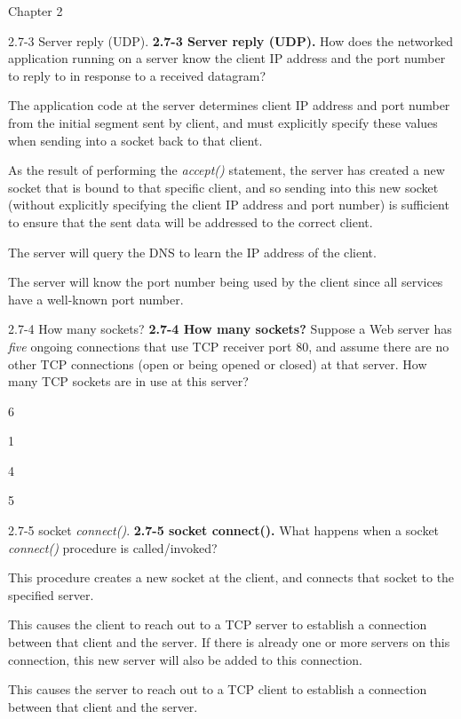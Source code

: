\documentclass[a4paper]{article}
\begin{document}
\begin{quiz}{Chapter 2}
\begin{multi}[points=1,shuffle]{2.7-3 Server reply (UDP).}
\textbf{2.7-3 Server reply (UDP).} 
How does the networked application running on a server know the client IP address and the port number to reply to in response to a received datagram?
\item* The  application code at the server determines client IP address and port number from the initial segment sent by client, and must explicitly specify these values when sending into a socket back to that client.
\item As the result of performing the \emph{accept()} statement, the server has created a new socket that is bound to that specific client, and so sending into this new socket (without explicitly specifying the client IP address and port number) is sufficient to ensure that the sent data will be addressed to the correct client.
\item The server will query the DNS to learn the IP address of the client.
\item The server will know the port number being used by the client since all services have a well-known port number.
\end{multi}

\begin{multi}[points=1,shuffle]{2.7-4 How many sockets?}
\textbf{2.7-4 How many sockets?} 
Suppose a Web server has \emph{five} ongoing connections that use TCP receiver port 80, and assume there are no other TCP connections (open or being opened or closed) at that server.  How many TCP sockets are in use at this server?
\item* 6
\item 1
\item 4
\item 5
\end{multi}

\begin{multi}[points=1,shuffle]{2.7-5 socket \emph{connect()}.}
\textbf{2.7-5 socket connect().} 
What happens when a socket \emph{connect()} procedure is called/invoked?
\item* This procedure creates a new socket at the client, and connects that socket to the specified server.
\item This causes the client to reach out to a TCP server to establish a connection between that client and the server. If there is already one or more servers on this connection, this new server will also be added to this connection.
\item This causes the server to reach out to a TCP client to establish a connection between that client and the server.
\end{multi}

\end{quiz}
\end{document}
